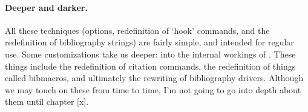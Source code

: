 \paragraph{Deeper and darker.}
All these techniques (options, redefinition of `hook' commands, and
the redefinition of bibliography strings) are fairly simple, and
intended for regular use. Some customizations take us deeper: into the
internal workings of \biblatex. These things include the redefinition
of citation commands, the redefinition of things called bibmacros, and
ultimately the rewriting of bibliography drivers. Although we may
touch on these from time to time, I'm not going to go into depth about
them until chapter [x].
